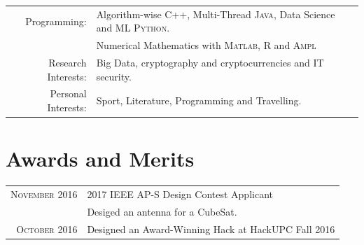\documentclass[a4paper,10pt]{article} %
\begin{document}
\begin{tabular}{rl}
Programming:  & Algorithm-wise \textsc{C++}, Multi-Thread \textsc{Java}, Data Science and ML \textsc{Python}. \\
 &  Numerical Mathematics with \textsc{Matlab}, \textsc{R} and \textsc{Ampl} \\
 Research Interests: & Big Data, cryptography and cryptocurrencies and IT security. \\
Personal Interests: & Sport, Literature, Programming and Travelling.
\end{tabular}


\section{Awards and Merits}
\begin{tabular}{rl}
\textsc{November} 2016 & 2017 IEEE AP-S Design Contest Applicant \\
 & Desiged an antenna for a CubeSat. \\
\textsc{October} 2016 & Designed an Award-Winning Hack at HackUPC Fall 2016
\end{tabular}

%
%
%	
\end{document}
